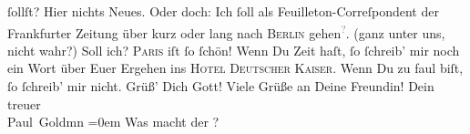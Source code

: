 \begin{ledgroupsized}[t]{13cm}
               ſollſt?\pend
           \pstart
           Hier nichts Neues. Oder doch: Ich ſoll als Feuilleton-Correſpondent der Frankfurter Zeitung über kurz oder lang nach \textsc{Berlin} gehen\substVorne{}\textsuperscript{\textcolor{gray}{?}}\substDazwischen{}.\substHinten{} (ganz unter uns, nicht wahr?) Soll ich? \textsc{Paris} iſt ſo ſchön!\pend
           \pstart
           Wenn Du Zeit haſt, ſo ſchreib’ mir noch ein Wort über Euer Ergehen ins \textsc{Hotel Deutscher Kaiser}. Wenn Du zu faul biſt, ſo ſchreib’ mir nicht.\pend
           \pstart
           Grüß’ Dich Gott! Viele Grüße an Deine Freundin!\pend
           \pstart
           Dein treuer {\\[\baselineskip]}\spacefill\mbox{Paul Goldmn}\pend
           \leftskip=0em{}\pstart
           \noindent{}Was macht der \label{K_L02810-5v}\label{K_L02810-5h}?\pend
           
         
         \endnumbering{}\end{ledgroupsized}  \newcommand{\dateiname}{L02810}\newcommand{\titel}{Paul Goldmann an Arthur Schnitzler, 28. 4. 1897}\newcommand{\editorInnen}{Martin Anton Müller und Laura Untner}
      